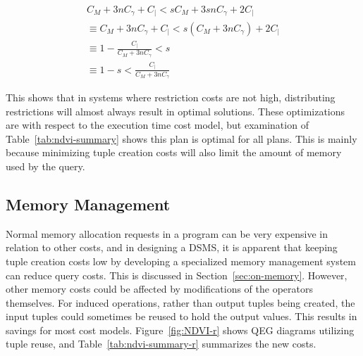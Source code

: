 \documentclass{ucdthesis}       %
\begin{document}
\begin{gather*}
C_{M} + 3 n C_{\gamma} + C_{|} <  s C_{M} + 3 s n C_{\gamma} + 2 C_{|} \\
\equiv C_{M} + 3 n C_{\gamma} + C_{|} <  s (C_{M} + 3 n C_{\gamma} ) + 2 C_{|} \\
\equiv 1 - \frac{C_{|}}{C_{M} + 3 n C_{\gamma}}  <  s \\
\equiv 1 - s < \frac{C_{|}}{C_{M} + 3 n C_{\gamma}}
\end{gather*}

This shows that in systems where restriction costs are not high,
distributing restrictions will almost always result in optimal
solutions.  These optimizations are with respect to the execution time
cost model, but examination of Table~\ref{tab:ndvi-summary} shows this
plan is optimal for all plans.  This is mainly because minimizing
tuple creation costs will also limit the amount of memory used by the
query.

\subsection{Memory Management}
\label{sec:memory-management}

Normal memory allocation requests in a program can be very expensive
in relation to other costs, and in designing a \ac{DSMS}, it is
apparent that keeping tuple creation costs low by developing a
specialized memory management system can reduce query costs.  This is
discussed in Section~\ref{sec:on-memory}.  However, other memory costs
could be affected by modifications of the operators themselves.  For
induced operations, rather than output tuples being created, the input
tuples could sometimes be reused to hold the output values.  This
results in savings for most cost models.  Figure~\ref{fig:NDVI-r}
shows \ac{QEG} diagrams utilizing tuple reuse, and
Table~\ref{tab:ndvi-summary-r} summarizes the new costs.
\end{document}
